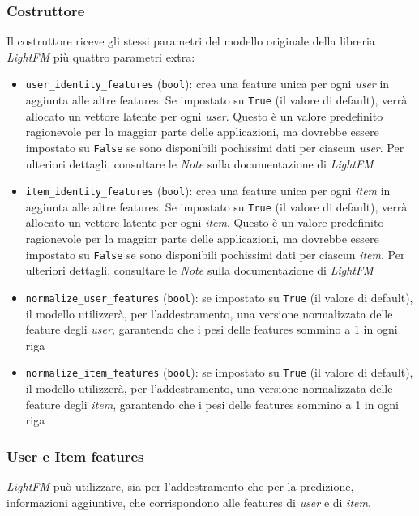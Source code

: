 \subsubsection{Costruttore}

Il costruttore riceve gli stessi parametri del modello originale della libreria \textit{LightFM} più quattro parametri extra:

\begin{itemize}
    \item \texttt{user\_identity\_features} (\texttt{bool}): crea una feature unica per ogni \textit{user} in aggiunta alle altre features. Se impostato su \texttt{True} (il valore di default), verrà allocato un vettore latente per ogni \textit{user}.  Questo è un valore predefinito ragionevole per la maggior parte delle applicazioni, ma dovrebbe essere impostato su \texttt{False} se sono disponibili pochissimi dati per ciascun \textit{user}. Per ulteriori dettagli, consultare le \textit{Note} sulla documentazione di \textit{LightFM}
    \item \texttt{item\_identity\_features} (\texttt{bool}): crea una feature unica per ogni \textit{item} in aggiunta alle altre features. Se impostato su \texttt{True} (il valore di default), verrà allocato un vettore latente per ogni \textit{item}. Questo è un valore predefinito ragionevole per la maggior parte delle applicazioni, ma dovrebbe essere impostato su \texttt{False} se sono disponibili pochissimi dati per ciascun \textit{item}. Per ulteriori dettagli, consultare le \textit{Note} sulla documentazione di \textit{LightFM}
    \item \texttt{normalize\_user\_features} (\texttt{bool}): se impostato su \texttt{True} (il valore di default), il modello utilizzerà, per l'addestramento, una versione normalizzata delle feature degli \textit{user}, garantendo che i pesi delle features sommino a 1 in ogni riga
    \item \texttt{normalize\_item\_features} (\texttt{bool}): se impostato su \texttt{True} (il valore di default), il modello utilizzerà, per l'addestramento, una versione normalizzata delle feature degli \textit{item}, garantendo che i pesi delle features sommino a 1 in ogni riga
\end{itemize}

\subsubsection{User e Item features}

\textit{LightFM} può utilizzare, sia per l'addestramento che per la predizione, informazioni aggiuntive, che corrispondono alle features di \textit{user} e di \textit{item}. 

